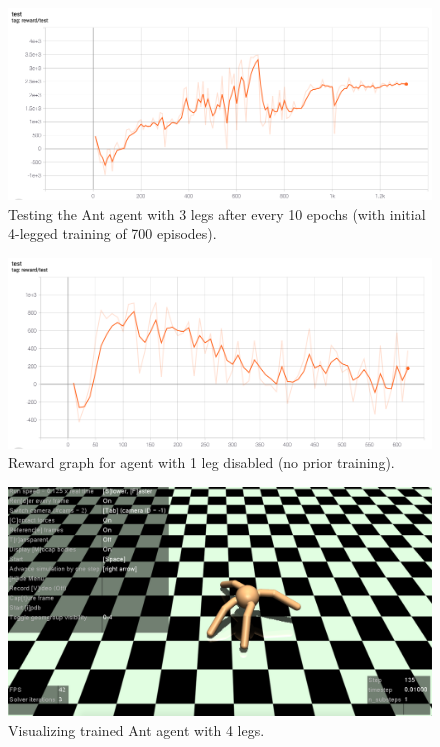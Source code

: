 \documentclass[conference]{IEEEtran}
\begin{document}
\begin{figure}[htbp]
\centerline{\includegraphics[width=\linewidth]{img/ant-1-disabled-reward_test.png}}
\caption{Testing the Ant agent with 3 legs after every 10 epochs (with initial 4-legged training of 700 episodes).}
\label{fig1legdisabledtest}
\end{figure}

\begin{figure}[htbp]
\centerline{\includegraphics[width=\linewidth]{img/ant-3leg-no4.png}}
\caption{Reward graph for agent with 1 leg disabled (no prior training).}
\label{fig3legnotrain}
\end{figure}

\begin{figure}[htbp]
\centerline{\includegraphics[width=\linewidth]{img/imgAntVis.png}}
\caption{Visualizing trained Ant agent with 4 legs.}
\label{fig3legnotrain}
\end{figure}
\end{document}

